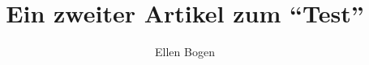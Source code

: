 \documentclass{dtk2}
\author{Ellen Bogen}
\begin{document}
\title{Ein zweiter Artikel zum "`Test"'}

\maketitle

\blinddocument

\printbibliography
\end{document}
